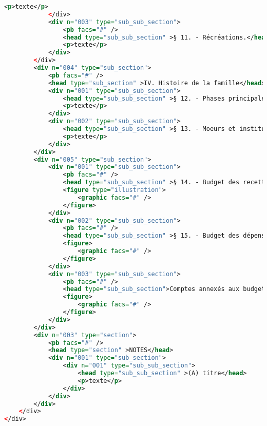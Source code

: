 \begin{lstlisting}[language=XML,breaklines]
                <p>texte</p>
            </div>
            <div n="003" type="sub_sub_section">
                <pb facs="#" />
                <head type="sub_sub_section" >§ 11. - Récréations.</head>
                <p>texte</p>
            </div>
        </div>
        <div n="004" type="sub_section">
            <pb facs="#" />
            <head type="sub_section" >IV. Histoire de la famille</head>
            <div n="001" type="sub_sub_section">
                <head type="sub_sub_section" >§ 12. - Phases principales de l'existence.</head>
                <p>texte</p>
            </div>
            <div n="002" type="sub_sub_section">
                <head type="sub_sub_section" >§ 13. - Moeurs et institutions assurant le  bien-être physique et moral de la famille.</head>
                <p>texte</p>
            </div>
        </div>
        <div n="005" type="sub_section">
            <div n="001" type="sub_sub_section">
                <pb facs="#" />
                <head type="sub_sub_section" >§ 14. - Budget des recettes de l'année.</head>
                <figure type="illustration">
                    <graphic facs="#" />
                </figure>
            </div>
            <div n="002" type="sub_sub_section">
                <pb facs="#" />
                <head type="sub_sub_section" >§ 15. - Budget des dépenses de l'année.</head>
                <figure>
                    <graphic facs="#" />
                </figure>
            </div>
            <div n="003" type="sub_sub_section">
                <pb facs="#" />
                <head type="sub_sub_section">Comptes annexés aux budgets.</head>
                <figure>
                    <graphic facs="#" />
                </figure>
            </div>
        </div>
        <div n="003" type="section">
            <pb facs="#" />
            <head type="section" >NOTES</head>
            <div n="001" type="sub_section">
                <div n="001" type="sub_sub_section">
                    <head type="sub_sub_section" >(A) titre</head>
                    <p>texte</p>
                </div>
            </div>
        </div>
    </div>
</div>
\end{lstlisting}